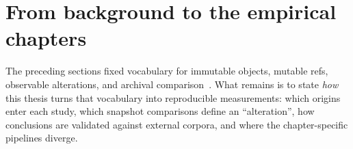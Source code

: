 

\section*{From background to the empirical chapters}
\label{sec:bg-to-methods}

The preceding sections fixed vocabulary for immutable objects, mutable refs, observable alterations, and archival comparison~\cite{swhcacm2018,cise-2020-doi}.
What remains is to state \emph{how} this thesis turns that vocabulary into reproducible measurements: which origins enter each study, which snapshot comparisons define an ``alteration'', how conclusions are validated against external corpora, and where the chapter-specific pipelines diverge.

